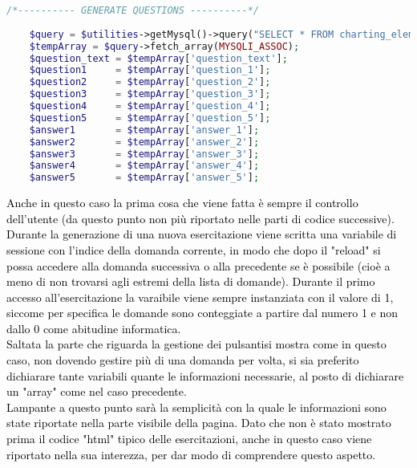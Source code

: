 \begin{lstlisting}[language=php]
	/*---------- GENERATE QUESTIONS ----------*/
	
	$query = $utilities->getMysql()->query("SELECT * FROM charting_elements WHERE (id = '{$_SESSION['numbers']}')");
	$tempArray = $query->fetch_array(MYSQLI_ASSOC);
	$question_text = $tempArray['question_text'];
	$question1     = $tempArray['question_1'];
	$question2     = $tempArray['question_2'];
	$question3     = $tempArray['question_3'];
	$question4     = $tempArray['question_4'];
	$question5     = $tempArray['question_5'];
	$answer1       = $tempArray['answer_1'];
	$answer2       = $tempArray['answer_2'];
	$answer3       = $tempArray['answer_3'];
	$answer4       = $tempArray['answer_4'];
	$answer5       = $tempArray['answer_5'];
\end{lstlisting}

\textcolor{black}{Anche in questo caso la prima cosa che viene fatta è sempre il controllo dell'utente (da questo punto non più riportato nelle parti di codice successive).  Durante la generazione di una nuova esercitazione viene scritta una variabile di sessione con l'indice della domanda corrente, in modo che dopo il "reload" si possa accedere alla domanda successiva o alla precedente se è possibile (cioè a meno di non trovarsi agli estremi della lista di domande). Durante il primo accesso all'esercitazione la varaibile viene sempre instanziata con il valore di 1, siccome per specifica le domande sono conteggiate a partire dal numero 1 e non dallo 0 come abitudine informatica.\\
Saltata la parte che riguarda la gestione dei pulsantisi mostra come in questo caso, non dovendo gestire più di una domanda per volta,  si sia preferito dichiarare tante variabili quante le informazioni necessarie, al posto di dichiarare un "array" come nel caso precedente.\\
Lampante a questo punto sarà la semplicità con la quale le informazioni sono state riportate nella parte visibile della pagina. Dato che non è stato mostrato prima il codice "html" tipico delle esercitazioni, anche in questo caso viene riportato nella sua interezza, per dar modo di comprendere questo aspetto.}\\

